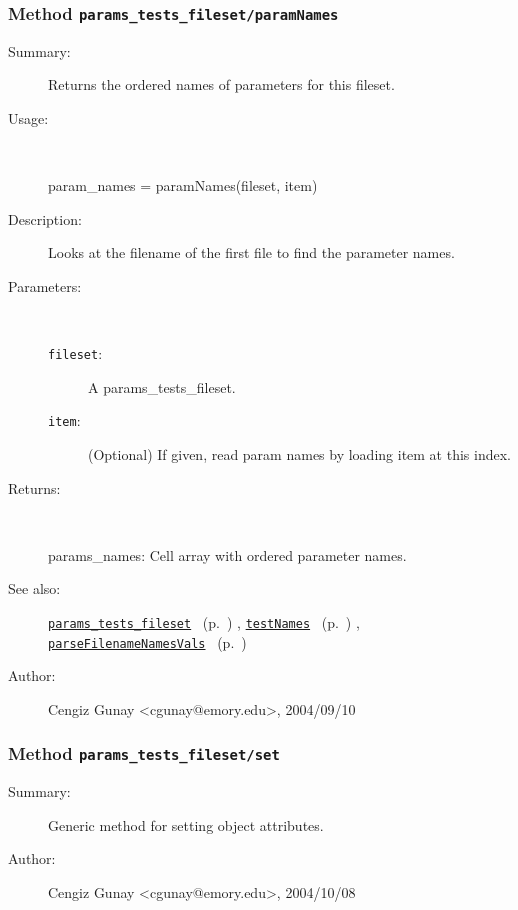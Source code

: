\subsubsection[Method \texttt{paramNames}]{Method \texttt{params\_tests\_fileset/paramNames}}%
%
\label{ref_params_tests_fileset__paramNames}%
\hypertarget{ref_params_tests_fileset__paramNames}{}%
\begin{description}
\item[Summary:]Returns the ordered names of parameters for this fileset.
%
\item[Usage:]~%
\begin{lyxcode}%
param\_names = paramNames(fileset, item)
%
\end{lyxcode}%
%
\item[Description:]%
Looks at the filename of the first file to find the parameter names.
\item[Parameters:]~
\begin{description}%
\item[\texttt{fileset}:]
 A params\_tests\_fileset.
\item[\texttt{item}:]
 (Optional) If given, read param names by loading item at this index.
\end{description}%
%
\item[Returns:
]~

	params\_names: Cell array with ordered parameter names.
%
%
\item[See also:]%
\hyperlink{ref_params_tests_fileset}{\texttt{params\_tests\_fileset}}%
\ (p.~\pageref{ref_params_tests_fileset})%
%
, \hyperlink{ref_testNames}{\texttt{testNames}}%
\ (p.~\pageref{ref_testNames})%
%
, \hyperlink{ref_parseFilenameNamesVals}{\texttt{parseFilenameNamesVals}}%
\ (p.~\pageref{ref_parseFilenameNamesVals})%
%
%
\item[Author:]%
Cengiz Gunay <cgunay@emory.edu>, 2004/09/10
%
\end{description}
\methodline%
\subsubsection[Method \texttt{set}]{Method \texttt{params\_tests\_fileset/set}}%
%
\label{ref_params_tests_fileset__set}%
\hypertarget{ref_params_tests_fileset__set}{}%
\begin{description}
\item[Summary:]Generic method for setting object attributes.
%
%
%
%
%
%
%
\item[Author:]%
Cengiz Gunay <cgunay@emory.edu>, 2004/10/08
%
\end{description}
\methodline%
